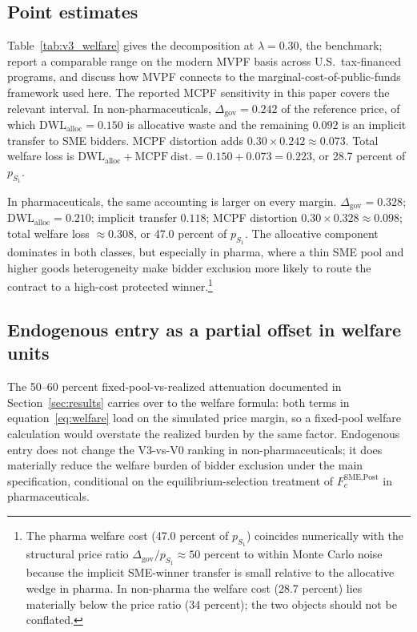 \subsection{Point estimates}

Table~\ref{tab:v3_welfare} gives the decomposition at $\lambda = 0.30$, the \citet{ballard1985} benchmark; \citet{hendren2020} report a comparable range on the modern MVPF basis across U.S.\ tax-financed programs, and \citet{finkelstein2020} discuss how MVPF connects to the marginal-cost-of-public-funds framework used here. The reported MCPF sensitivity in this paper covers the relevant interval. In non-pharmaceuticals, $\Delta_{\text{gov}} = 0.242$ of the reference price, of which $\mathrm{DWL}_{\text{alloc}} = 0.150$ is allocative waste and the remaining $0.092$ is an implicit transfer to SME bidders. MCPF distortion adds $0.30 \times 0.242 \approx 0.073$. Total welfare loss is $\mathrm{DWL}_{\text{alloc}} + \mathrm{MCPF\ dist.} = 0.150 + 0.073 = 0.223$, or 28.7 percent of $p_{S_1}$.

In pharmaceuticals, the same accounting is larger on every margin. $\Delta_{\text{gov}} = 0.328$; $\mathrm{DWL}_{\text{alloc}} = 0.210$; implicit transfer $0.118$; MCPF distortion $0.30 \times 0.328 \approx 0.098$; total welfare loss $\approx 0.308$, or 47.0 percent of $p_{S_1}$. The allocative component dominates in both classes, but especially in pharma, where a thin SME pool and higher goods heterogeneity make bidder exclusion more likely to route the contract to a high-cost protected winner.\footnote{The pharma welfare cost (47.0 percent of $p_{S_1}$) coincides numerically with the structural price ratio $\Delta_{\text{gov}}/p_{S_1} \approx 50$ percent to within Monte Carlo noise because the implicit SME-winner transfer is small relative to the allocative wedge in pharma. In non-pharma the welfare cost (28.7 percent) lies materially below the price ratio (34 percent); the two objects should not be conflated.}

\subsection{Endogenous entry as a partial offset in welfare units}

The 50--60 percent fixed-pool-vs-realized attenuation documented in Section~\ref{sec:results} carries over to the welfare formula: both terms in equation~\eqref{eq:welfare} load on the simulated price margin, so a fixed-pool welfare calculation would overstate the realized burden by the same factor. Endogenous entry does not change the V3-vs-V0 ranking in non-pharmaceuticals; it does materially reduce the welfare burden of bidder exclusion under the main specification, conditional on the equilibrium-selection treatment of $F_c^{\text{SME,Post}}$ in pharmaceuticals.

